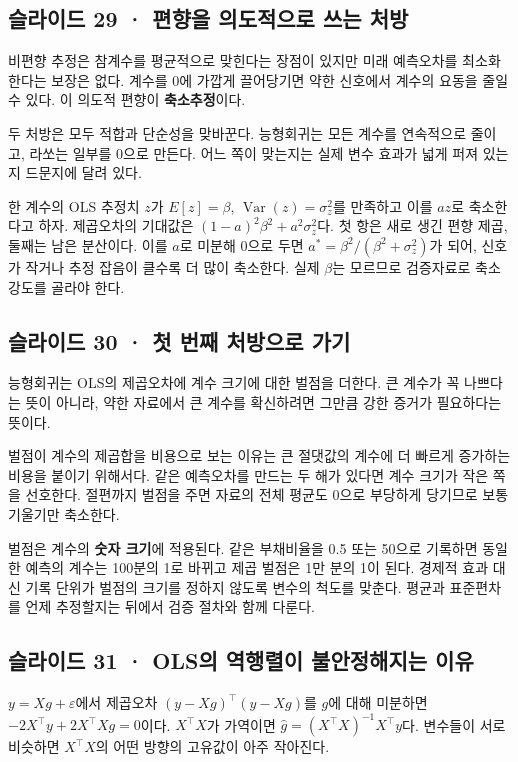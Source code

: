 \documentclass[11pt,a4paper]{article}
\begin{document}
\subsection{슬라이드 29 · 편향을 의도적으로 쓰는 처방}
비편향 추정은 참계수를 평균적으로 맞힌다는 장점이 있지만 미래 예측오차를 최소화한다는 보장은 없다. 계수를 0에 가깝게 끌어당기면 약한 신호에서 계수의 요동을 줄일 수 있다. 이 의도적 편향이 \textbf{축소추정}이다.\par

두 처방은 모두 적합과 단순성을 맞바꾼다. 능형회귀는 모든 계수를 연속적으로 줄이고, 라쏘는 일부를 0으로 만든다. 어느 쪽이 맞는지는 실제 변수 효과가 넓게 퍼져 있는지 드문지에 달려 있다.\par

한 계수의 OLS 추정치 $z$가 $E[z]=\beta$, $\operatorname{Var}(z)=\sigma_z^2$를 만족하고 이를 $az$로 축소한다고 하자. 제곱오차의 기대값은 $(1-a)^2\beta^2+a^2\sigma_z^2$다. 첫 항은 새로 생긴 편향 제곱, 둘째는 남은 분산이다. 이를 $a$로 미분해 0으로 두면 $a^*=\beta^2/(\beta^2+\sigma_z^2)$가 되어, 신호가 작거나 추정 잡음이 클수록 더 많이 축소한다. 실제 $\beta$는 모르므로 검증자료로 축소 강도를 골라야 한다.\par

\subsection{슬라이드 30 · 첫 번째 처방으로 가기}
능형회귀는 OLS의 제곱오차에 계수 크기에 대한 벌점을 더한다. 큰 계수가 꼭 나쁘다는 뜻이 아니라, 약한 자료에서 큰 계수를 확신하려면 그만큼 강한 증거가 필요하다는 뜻이다.\par

벌점이 계수의 제곱합을 비용으로 보는 이유는 큰 절댓값의 계수에 더 빠르게 증가하는 비용을 붙이기 위해서다. 같은 예측오차를 만드는 두 해가 있다면 계수 크기가 작은 쪽을 선호한다. 절편까지 벌점을 주면 자료의 전체 평균도 0으로 부당하게 당기므로 보통 기울기만 축소한다.\par

벌점은 계수의 \textbf{숫자 크기}에 적용된다. 같은 부채비율을 0.5 또는 50으로 기록하면 동일한 예측의 계수는 100분의 1로 바뀌고 제곱 벌점은 1만 분의 1이 된다. 경제적 효과 대신 기록 단위가 벌점의 크기를 정하지 않도록 변수의 척도를 맞춘다. 평균과 표준편차를 언제 추정할지는 뒤에서 검증 절차와 함께 다룬다.\par

\subsection{슬라이드 31 · OLS의 역행렬이 불안정해지는 이유}
$y=Xg+\varepsilon$에서 제곱오차 $(y-Xg)^\top(y-Xg)$를 $g$에 대해 미분하면 $-2X^\top y+2X^\top Xg=0$이다. $X^\top X$가 가역이면 $\hat g=(X^\top X)^{-1}X^\top y$다. 변수들이 서로 비슷하면 $X^\top X$의 어떤 방향의 고유값이 아주 작아진다.\par
\end{document}
